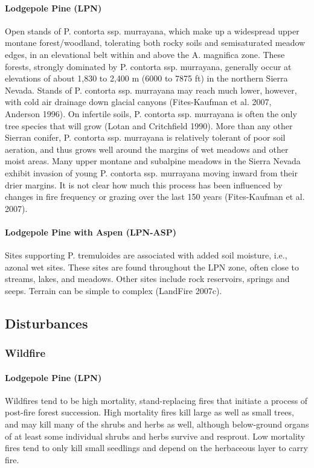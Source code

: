 \paragraph{Lodgepole Pine (LPN)}	Open stands of P. contorta ssp. murrayana, which make up a widespread upper montane forest/woodland, tolerating both rocky soils and semisaturated meadow edges, in an elevational belt within and above the A. magnifica zone. These forests, strongly dominated by P. contorta ssp. murrayana, generally occur at elevations of about 1,830 to 2,400 m (6000 to 7875 ft) in the northern Sierra Nevada. Stands of P. contorta ssp. murrayana may reach much lower, however, with cold air drainage down glacial canyons (Fites-Kaufman et al. 2007, Anderson 1996). On infertile soils, P. contorta ssp. murrayana is often the only tree species that will grow (Lotan and Critchfield 1990).
More than any other Sierran conifer, P. contorta ssp. murrayana is relatively tolerant of poor soil aeration, and thus grows well around the margins of wet meadows and other moist areas. Many upper montane and subalpine meadows in the Sierra Nevada exhibit invasion of young P. contorta ssp. murrayana moving inward from their drier margins. It is not clear how much this process has been influenced by changes in fire frequency or grazing over the last 150 years (Fites-Kaufman et al. 2007).

\paragraph{Lodgepole Pine with Aspen (LPN-ASP)}		Sites supporting P. tremuloides are associated with added soil moisture, i.e., azonal wet sites. These sites are found throughout the LPN zone, often close to streams, lakes, and meadows. Other sites include rock reservoirs, springs and seeps. Terrain can be simple to complex (LandFire 2007c). 


\subsection*{Disturbances}

\subsubsection{Wildfire}

\paragraph{Lodgepole Pine (LPN)} 	Wildfires tend to be high mortality, stand-replacing fires that initiate a process of post-fire forest succession. High mortality fires kill large as well as small trees, and may kill many of the shrubs and herbs as well, although below-ground organs of at least some individual shrubs and herbs survive and resprout. Low mortality fires tend to only kill small seedlings and depend on the herbaceous layer to carry fire.

